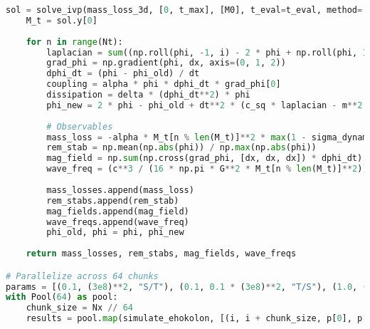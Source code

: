 \documentclass[11pt]{article}
\begin{document}
\begin{lstlisting}[language=Python, caption={Fluxonic Black Hole Evaporation Simulation}, label=lst:simulation]
    sol = solve_ivp(mass_loss_3d, [0, t_max], [M0], t_eval=t_eval, method='RK45', args=(phi,))
    M_t = sol.y[0]
    
    for n in range(Nt):
        laplacian = sum((np.roll(phi, -1, i) - 2 * phi + np.roll(phi, 1, i)) / dx**2 for i in range(3))
        grad_phi = np.gradient(phi, dx, axis=(0, 1, 2))
        dphi_dt = (phi - phi_old) / dt
        coupling = alpha * phi * dphi_dt * grad_phi[0]
        dissipation = delta * (dphi_dt**2) * phi
        phi_new = 2 * phi - phi_old + dt**2 * (c_sq * laplacian - m**2 * phi - g * phi**3 - eta * phi**5 + coupling - dissipation)
        
        # Observables
        mass_loss = -alpha * M_t[n % len(M_t)]**2 * max(1 - sigma_dynamic(2 * G * M_t[n % len(M_t)] / c**2, M_t[n % len(M_t)]) * rho_dynamic(2 * G * M_t[n % len(M_t)] / c**2, M_t[n % len(M_t)]) / (2 * G * M_t[n % len(M_t)] / c**2), 0)**4
        rem_stab = np.mean(np.abs(phi)) / np.max(np.abs(phi))
        mag_field = np.sum(np.cross(grad_phi, [dx, dx, dx]) * dphi_dt) * dx**3
        wave_freq = (c**3 / (16 * np.pi * G**2 * M_t[n % len(M_t)]**2)) * np.maximum(2 * G * M_t[n % len(M_t)] - c**2 * rho_dynamic(2 * G * M_t[n % len(M_t)] / c**2, M_t[n % len(M_t)]), 0)
        
        mass_losses.append(mass_loss)
        rem_stabs.append(rem_stab)
        mag_fields.append(mag_field)
        wave_freqs.append(wave_freq)
        phi_old, phi = phi, phi_new
    
    return mass_losses, rem_stabs, mag_fields, wave_freqs

# Parallelize across 64 chunks
params = [(0.1, (3e8)**2, "S/T"), (0.1, 0.1 * (3e8)**2, "T/S"), (1.0, (3e8)**2, "S=T")]
with Pool(64) as pool:
    chunk_size = Nx // 64
    results = pool.map(simulate_ehokolon, [(i, i + chunk_size, p[0], p[1]) for i in range(0, Nx, chunk_size) for p in params])
\end{lstlisting}
\end{document}
